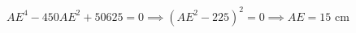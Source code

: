 \documentclass[preview]{standalone}
\begin{document}
\begin{align*}
AE^4 - 450AE^2 + 50625 = 0 \implies (AE^2 - 225)^2 = 0 \implies AE = 15 \text{ cm}
\end{align*}
\end{document}
